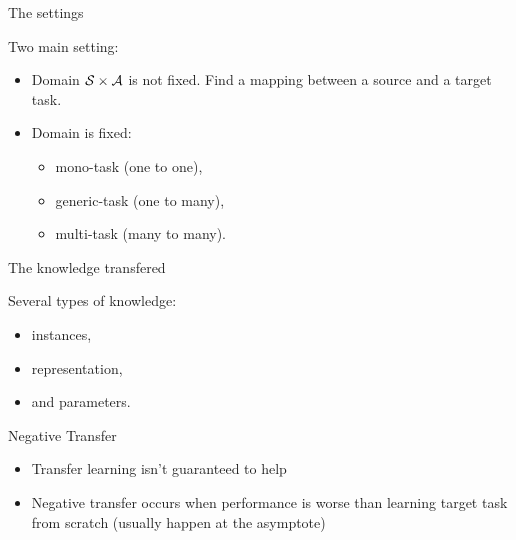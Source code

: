 \documentclass{beamer}
\begin{document}
    \begin{frame}{The settings}

        Two main setting:

        \begin{itemize}
            \item Domain $\mathcal{S}\times \mathcal{A}$ is not fixed. Find a mapping between a source and a target task.
            \item Domain is fixed:
            \begin{itemize}
                \item mono-task (one to one),
                \item generic-task (one to many),
                \item multi-task  (many to many).
            \end{itemize}
        \end{itemize}

    \end{frame}

    \begin{frame}{The knowledge transfered}

        Several types of knowledge:
        \begin{itemize}
            \item instances, %
            \item representation, %
            \item and parameters. %
        \end{itemize}

    \end{frame}

    \begin{frame}{Negative Transfer}

        \begin{itemize}
            \item Transfer learning isn’t guaranteed to help
            \item Negative transfer occurs when performance is worse than learning
            target task from scratch (usually happen at the asymptote)
        \end{itemize}

    \end{frame}
\end{document}
